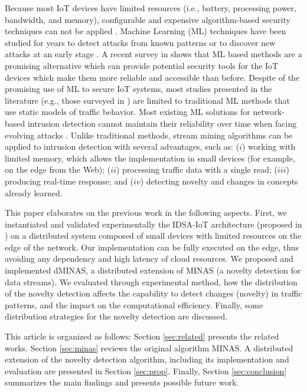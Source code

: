 Because most IoT devices have limited resources (i.e., battery, processing
power, bandwidth, and memory), configurable and expensive algorithm-based
security techniques can not be applied \cite{Zhou2017}.
Machine Learning (ML) techniques have been studied for years to detect attacks
from known patterns or to discover new attacks at an early stage
\cite{buczak2016survey,mitchell2014survey}.
A recent survey in \cite{Tahsien2020} shows that ML based methods are a
promising alternative which can provide potential security tools for the IoT
devices which make them more reliable and accessible than before.
Despite of the promising use of ML to secure IoT systems, most studies presented
in the literature (e.g., those surveyed in
\cite{buczak2016survey,mitchell2014survey,Tahsien2020}) are limited to
traditional ML methods that use static models of traffic behavior.
Most existing ML solutions for network-based intrusion detection cannot maintain
their reliability over time when facing evolving attacks \cite{Viegas2019}.
Unlike traditional methods, stream mining algorithms can be applied to intrusion
detection with several advantages, such as: ($ i $) working with limited memory,
which allows the implementation in small devices (for example, on the edge from
the Web); ($ ii $) processing traffic data with a single read; ($ iii $)
producing real-time response; and ($ iv $) detecting novelty and changes in
concepts already learned.

{\color{red} This paper elaborates on the previous work in the following
aspects. First, we instantiated and validated experimentally the IDSA-IoT
architecture (proposed in \cite{Cassales2019a} ) on a distributed system
composed of small devices with limited resources on the edge of the network. Our
implementation can be fully executed on the edge, thus avoiding any dependency
and high latency of cloud resources. We proposed and implemented dMINAS, a
distributed extension of MINAS \cite{Faria2016minas} (a novelty detection for
data streams). We evaluated through experimental method, how the distribution of
the novelty detection affects the capability to detect changes (novelty) in
traffic patterns, and the impact on the computational efficiency. Finally, some
distribution strategies for the novelty detection are discussed. }

This article is organized as follows:
Section \ref{sec:related} presents the related works.
Section \ref{sec:minas} reviews the original algorithm MINAS.
A distributed extension of the novelty detection algorithm, including its
implementation and evaluation are presented in Section \ref{sec:prop}.
Finally, Section \ref{sec:conclusion} summarizes the main findings and presents
possible future work.

